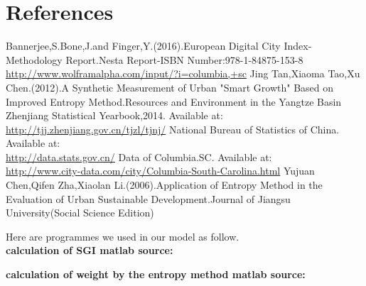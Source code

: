 \documentclass{mcmthesis}
\begin{document}
\section{References}
\begin{thebibliography}{99}
Bannerjee,S.Bone,J.and Finger,Y.(2016).European Digital City Index-Methodology Report.Nesta Report-ISBN Number:978-1-84875-153-8
\url{http://www.wolframalpha.com/input/?i=columbia,+sc}
Jing Tan,Xiaoma Tao,Xu Chen.(2012).A Synthetic Measurement of Urban "Smart Growth" Based on Improved Entropy Method.Resources and Environment in the Yangtze Basin
Zhenjiang Statistical Yearbook,2014. Available at:\\
\url{http://tjj.zhenjiang.gov.cn/tjzl/tjnj/}
National Bureau of Statistics of China. Available at:\\
\url{http://data.stats.gov.cn/}
Data of Columbia.SC. Available at:\\
\url{http://www.city-data.com/city/Columbia-South-Carolina.html}
Yujuan Chen,Qifen Zha,Xiaolan Li.(2006).Application of Entropy Method in the Evaluation of Urban Sustainable Development.Journal of Jiangsu University(Social Science Edition)
\end{thebibliography}

\begin{appendices}
Here are  programmes we used in our model as follow.\\
\textbf{\textcolor[rgb]{0.98,0.00,0.00}{calculation of SGI matlab source:}}

\textbf{\textcolor[rgb]{0.98,0.00,0.00}{calculation of weight by the entropy method matlab source:}}
\noindent{}
\end{appendices}
\end{document}
